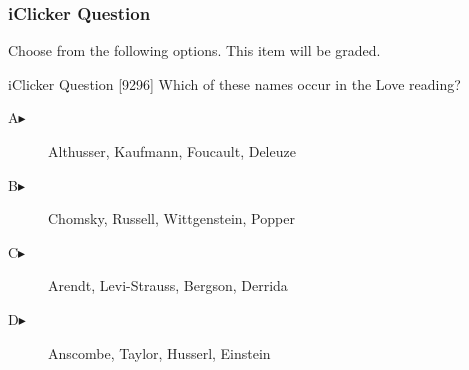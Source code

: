 \documentclass[xcolor=dvipsnames]{beamer}
\begin{document}
\begin{frame}
  \frametitle{iClicker Question}
Choose from the following options. This item will be graded.
\begin{block}{iClicker Question}
[9296] Which of these names occur in the Love reading?
\end{block}
\begin{description}
\item[A\hspace{.2in}$\blacktriangleright$] Althusser, Kaufmann, Foucault, Deleuze
\item[B\hspace{.2in}$\blacktriangleright$] Chomsky, Russell, Wittgenstein, Popper
\item[C\hspace{.2in}$\blacktriangleright$] Arendt, Levi-Strauss, Bergson, Derrida
\item[D\hspace{.2in}$\blacktriangleright$] Anscombe, Taylor, Husserl, Einstein
\end{description}
\end{frame}
\end{document}
